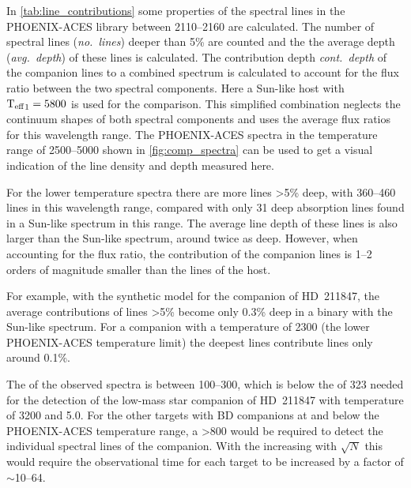 In \cref{tab:line_contributions} some properties of the spectral lines in the {PHOENIX-ACES} library between 2110--2160\nm{} are calculated.
The number of spectral lines (\emph{no.~lines}) deeper than 5\% are counted and the the average depth (\emph{avg.~depth}) of these lines is calculated.
The contribution depth \emph{cont.~depth} of the companion lines to a combined spectrum is calculated to account for the flux ratio between the two spectral components.
Here a Sun-like host with \({\textrm{T}_{\mathrm{eff}}}_{1}=5800\)\K{} is used for the comparison.
This simplified combination neglects the continuum shapes of both spectral components and uses the average flux ratios for this wavelength range.
The {PHOENIX-ACES} spectra in the temperature range of 2500--5000\K{} shown in \cref{fig:comp_spectra} can be used to get a visual indication of the line density and depth measured here.

For the lower temperature spectra there are more lines >5\% deep, with 360--460 lines in this wavelength range, compared with only 31 deep absorption lines found in a Sun-like spectrum in this range.
The average line depth of these lines is also larger than the Sun-like spectrum, around twice as deep.
However, when accounting for the flux ratio, the contribution of the companion lines is 1--2 orders of magnitude smaller than the lines of the host.

For example, with the synthetic model for the companion of {HD~211847}, the average contributions of lines >5\% become only 0.3\% deep in a binary with the Sun-like spectrum.
For a companion with a temperature of 2300\K{} (the lower {PHOENIX-ACES} temperature limit) the deepest lines contribute lines only around 0.1\%.


The \snr{} of the observed spectra is between 100--300, which is below the \snr{} of 323 needed for the detection of the low-mass star companion of {HD~211847} with temperature of 3200\K{} and \Logg{} 5.0.
For the other targets with {BD} companions at and below the {PHOENIX-ACES} temperature range, a \snr{} >800 would be required to detect the individual spectral lines of the companion.
With the \snr{} increasing with \(\sqrt{N}\) this would require the observational time for each target to be increased by a factor of \(\sim\)10--64.

